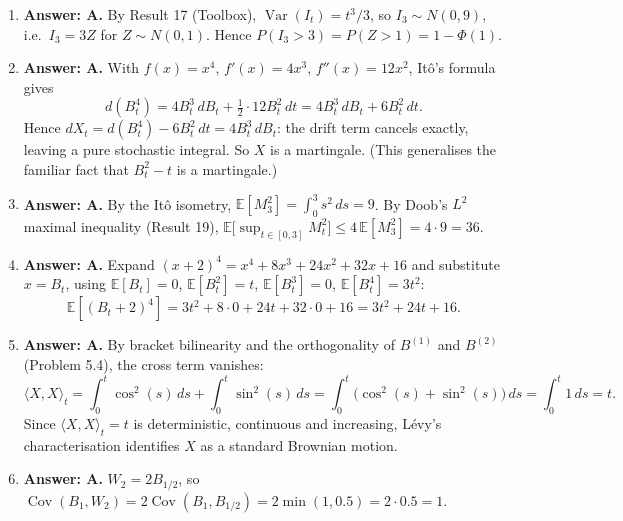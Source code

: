\documentclass[11pt]{article}
\newcommand{\E}{\mathbb{E}}
\DeclareMathOperator{\Var}{Var}
\DeclareMathOperator{\Cov}{Cov}
\newcommand{\ans}[1]{\par\noindent\textbf{\color{blue!50!black}Answer: #1}}
\begin{document}
\begin{enumerate}
\item[\textbf{Q5.}] \ans{A.} By Result 17 (Toolbox), $\Var(I_t)=t^3/3$, so $I_3\sim N(0,9)$, i.e.\ $I_3=3Z$ for $Z\sim N(0,1)$. Hence $P(I_3>3)=P(Z>1)=1-\Phi(1)$.

\item[\textbf{Q6.}] \ans{A.} With $f(x)=x^4$, $f'(x)=4x^3$, $f''(x)=12x^2$, It\^o's formula gives
\[
d(B_t^4)=4B_t^3\,dB_t+\tfrac12\cdot12B_t^2\,dt=4B_t^3\,dB_t+6B_t^2\,dt.
\]
Hence $dX_t=d(B_t^4)-6B_t^2\,dt=4B_t^3\,dB_t$: the drift term cancels exactly, leaving a pure stochastic integral. So $X$ is a martingale. (This generalises the familiar fact that $B_t^2-t$ is a martingale.)

\item[\textbf{Q7.}] \ans{A.} By the It\^o isometry, $\E[M_3^2]=\int_0^3s^2\,ds=9$. By Doob's $L^2$ maximal inequality (Result 19), $\E\big[\sup_{t\in[0,3]}M_t^2\big]\le4\,\E[M_3^2]=4\cdot9=36$.

\item[\textbf{Q8.}] \ans{A.} Expand $(x+2)^4=x^4+8x^3+24x^2+32x+16$ and substitute $x=B_t$, using $\E[B_t]=0$, $\E[B_t^2]=t$, $\E[B_t^3]=0$, $\E[B_t^4]=3t^2$:
\[
\E[(B_t+2)^4]=3t^2+8\cdot0+24t+32\cdot0+16=3t^2+24t+16.
\]

\item[\textbf{Q9.}] \ans{A.} By bracket bilinearity and the orthogonality of $B^{(1)}$ and $B^{(2)}$ (Problem 5.4), the cross term vanishes:
\[
\langle X,X\rangle_t=\int_0^t\cos^2(s)\,ds+\int_0^t\sin^2(s)\,ds=\int_0^t\big(\cos^2(s)+\sin^2(s)\big)\,ds=\int_0^t1\,ds=t.
\]
Since $\langle X,X\rangle_t=t$ is deterministic, continuous and increasing, L\'evy's characterisation identifies $X$ as a standard Brownian motion.

\item[\textbf{Q10.}] \ans{A.} $W_2=2B_{1/2}$, so $\Cov(B_1,W_2)=2\Cov(B_1,B_{1/2})=2\min(1,0.5)=2\cdot0.5=1$.


\end{enumerate}
\end{document}
